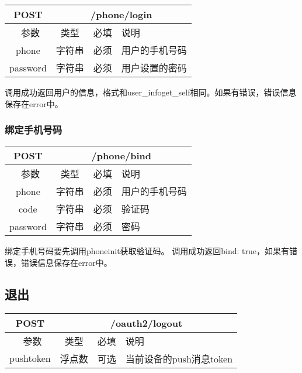 \begin{table}[H]
   \begin{center}
\begin{tabular}{|c|c|c|p{12cm}|}
\hline
POST & \multicolumn{3}{|c|}{/phone/login} \\
\hline\hline
 \  参数  & 类型 & 必填 &  说明  \\
\hline
 phone  & 字符串 & 必须 &  用户的手机号码\\
\hline
 password  & 字符串 & 必须 &  用户设置的密码\\
\hline
\end{tabular}
   \end{center}
\end{table}

调用成功返回用户的信息，格式和user\_info\/get\_self相同。如果有错误，错误信息保存在error中。



\subsubsection{绑定手机号码}
\label{hash_algorithm}

\begin{table}[H]
   \begin{center}
\begin{tabular}{|c|c|c|p{12cm}|}
\hline
POST & \multicolumn{3}{|c|}{/phone/bind} \\
\hline\hline
 \  参数  & 类型 & 必填 &  说明  \\
\hline
 phone  & 字符串 & 必须 &  用户的手机号码\\
\hline
 code  & 字符串 & 必须 &  验证码\\
 \hline
 password  & 字符串 & 必须 &  密码\\
\hline
\end{tabular}
   \end{center}
\end{table}

绑定手机号码要先调用phone\/init获取验证码。
调用成功返回{bind: true}，如果有错误，错误信息保存在error中。



\subsection{退出}

\begin{table}[H]
   \begin{center}
\begin{tabular}{|c|c|c|p{12cm}|}
\hline
POST & \multicolumn{3}{|c|}{/oauth2/logout} \\
\hline\hline
 \  参数  & 类型 & 必填 &  说明  \\
\hline
    pushtoken  & 浮点数 & 可选 &  当前设备的push消息token\\
\hline
\end{tabular}
   \end{center}
\end{table}

